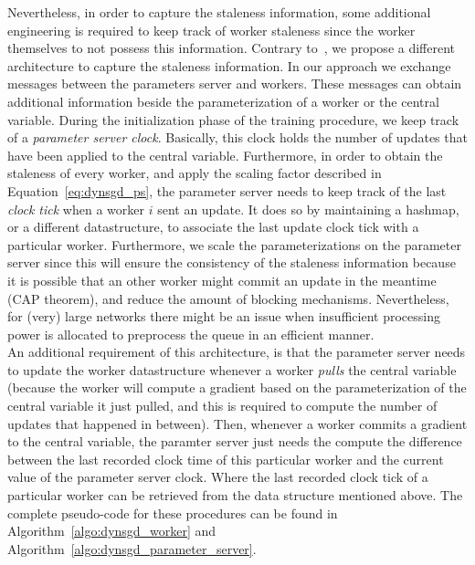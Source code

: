 Nevertheless, in order to capture the staleness information, some additional engineering is required to keep track of worker staleness since the worker themselves to not possess this information. Contrary to~\cite{jiang2017heterogeneity}, we propose a different architecture to capture the staleness information. In our approach we exchange messages between the parameters server and workers. These messages can obtain additional information beside the parameterization of a worker or the central variable. During the initialization phase of the training procedure, we keep track of a \emph{parameter server clock}. Basically, this clock holds the number of updates that have been applied to the central variable. Furthermore, in order to obtain the staleness of every worker, and apply the scaling factor described in Equation~\ref{eq:dynsgd_ps}, the parameter server needs to keep track of the last \emph{clock tick} when a worker $i$ sent an update. It does so by maintaining a hashmap, or a different datastructure, to associate the last update clock tick with a particular worker. Furthermore, we scale the parameterizations on the parameter server since this will ensure the consistency of the staleness information because it is possible that an other worker might commit an update in the meantime (CAP theorem), and reduce the amount of blocking mechanisms. Nevertheless, for (very) large networks there might be an issue when insufficient processing power is allocated to preprocess the queue in an efficient manner.\\

An additional requirement of this architecture, is that the parameter server needs to update the worker datastructure whenever a worker \emph{pulls} the central variable (because the worker will compute a gradient based on the parameterization of the central variable it just pulled, and this is required to compute the number of updates that happened in between). Then, whenever a worker commits a gradient to the central variable, the paramter server just needs the compute the difference between the last recorded clock time of this particular worker and the current value of the parameter server clock. Where the last recorded clock tick of a particular worker can be retrieved from the data structure mentioned above. The complete pseudo-code for these procedures can be found in Algorithm~\ref{algo:dynsgd_worker} and Algorithm~\ref{algo:dynsgd_parameter_server}.

\newpage

